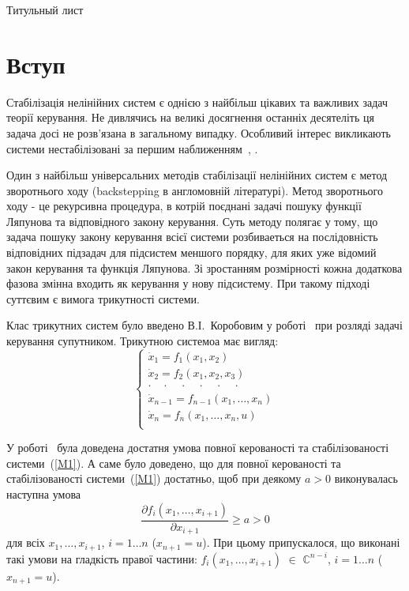 \documentclass{article}
\begin{document}
Титульный лист
\pagebreak
\tableofcontents
\pagebreak

\section{Вступ}

Стабілізація нелінійних систем є однією з найбільш цікавих та важливих задач теорії керування.
Не дивлячись на великі досягнення останніх десятеліть %
ця задача досі не розв'язана в 
загальному випадку. Особливий інтерес викликають системи нестабілізовані за першим
наближенням~\cite{BebiyaKorobov}, \cite{Bebiya}.

Один з найбільш універсальних методів стабілізації нелінійних систем є метод зворотнього ходу 
(backstepping в англомовній літературі).%
 Метод зворотнього ходу - це рекурсивна процедура, в котрій поєднані задачі пошуку функції Ляпунова та відповідного закону
керування. Суть методу полягає у тому, що задача пошуку закону керування всієї системи розбиваеться на послідовність
відповідних підзадач для підсистем меншого порядку, для яких уже відомий закон керування та функція Ляпунова.
Зі зростанням розмірності кожна додаткова фазова змінна входить як керування у нову підсистему. 
При такому підході суттєвим є вимога трикутності системи.

Клас трикутних систем було введено В.І.~Коробовим у роботі~\cite{Korobov} при розляді задачі
керування супутником.
Трикутною системоа має вигляд: 
\begin{equation}\label{M1}
	\begin{cases}
        \dot x_1 = f_1(x_1, x_2)\\
        \dot x_2 = f_2(x_1, x_2 ,x_3)\\
        \cdot \quad \cdot \quad \cdot \quad \cdot \quad \cdot \quad \cdot \quad\\
        \dot x_{n-1} = f_{n-1}(x_1, \dots ,x_n)\\
        \dot x_{n} = f_{n}(x_1, \dots ,x_n,u)\\
	\end{cases}
\end{equation}

У роботі~\cite{Korobov} була доведена достатня умова повної керованості та стабілізованості
системи~(\ref{M1}). А саме було доведено, що для повної керованості та стабілізованості
системи~(\ref{M1}) достатньо, щоб при деякому $a>0$ виконувалась наступна
умова 
\begin{equation}\label{M2}
    \frac{\partial f_i(x_1,\dots,x_{i+1})}{\partial x_{i+1}} \geq a > 0 
\end{equation} 
для всіх $x_1, \dots, x_{i+1}$, $i=1 \dots n $ ($x_{n+1} = u$). При цьому 
припускалося, що виконані такі умови на гладкість правої частини: 
$ f_i(x_1,\dots,x_{i+1})$ $\in$ $\mathbb{C}^{n-i}$, $i=1 \dots n $ ($x_{n+1} = u$).
\end{document}
